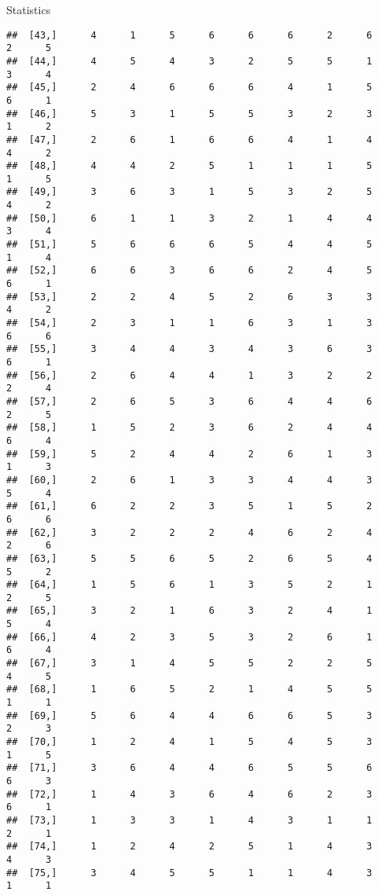 \documentclass[
  ignorenonframetext,
]{beamer}
\begin{document}
\begin{frame}[fragile]{Statistics}
\begin{verbatim}
##  [43,]      4      1      5      6      6      6      2      6      2      5
##  [44,]      4      5      4      3      2      5      5      1      3      4
##  [45,]      2      4      6      6      6      4      1      5      6      1
##  [46,]      5      3      1      5      5      3      2      3      1      2
##  [47,]      2      6      1      6      6      4      1      4      4      2
##  [48,]      4      4      2      5      1      1      1      5      1      5
##  [49,]      3      6      3      1      5      3      2      5      4      2
##  [50,]      6      1      1      3      2      1      4      4      3      4
##  [51,]      5      6      6      6      5      4      4      5      1      4
##  [52,]      6      6      3      6      6      2      4      5      6      1
##  [53,]      2      2      4      5      2      6      3      3      4      2
##  [54,]      2      3      1      1      6      3      1      3      6      6
##  [55,]      3      4      4      3      4      3      6      3      6      1
##  [56,]      2      6      4      4      1      3      2      2      2      4
##  [57,]      2      6      5      3      6      4      4      6      2      5
##  [58,]      1      5      2      3      6      2      4      4      6      4
##  [59,]      5      2      4      4      2      6      1      3      1      3
##  [60,]      2      6      1      3      3      4      4      3      5      4
##  [61,]      6      2      2      3      5      1      5      2      6      6
##  [62,]      3      2      2      2      4      6      2      4      2      6
##  [63,]      5      5      6      5      2      6      5      4      5      2
##  [64,]      1      5      6      1      3      5      2      1      2      5
##  [65,]      3      2      1      6      3      2      4      1      5      4
##  [66,]      4      2      3      5      3      2      6      1      6      4
##  [67,]      3      1      4      5      5      2      2      5      4      5
##  [68,]      1      6      5      2      1      4      5      5      1      1
##  [69,]      5      6      4      4      6      6      5      3      2      3
##  [70,]      1      2      4      1      5      4      5      3      1      5
##  [71,]      3      6      4      4      6      5      5      6      6      3
##  [72,]      1      4      3      6      4      6      2      3      6      1
##  [73,]      1      3      3      1      4      3      1      1      2      1
##  [74,]      1      2      4      2      5      1      4      3      4      3
##  [75,]      3      4      5      5      1      1      4      3      1      1

\end{verbatim}
\end{frame}
\end{document}
